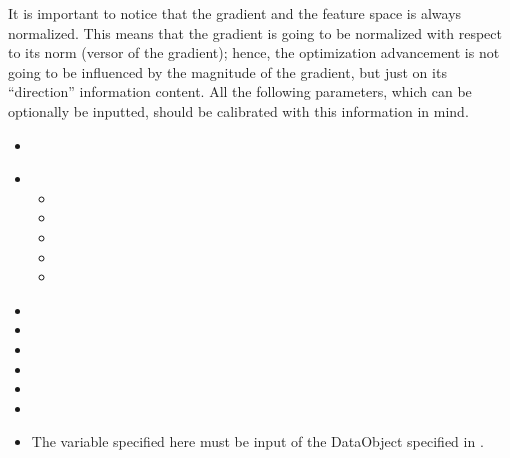 It is important to notice that the gradient and the feature space is always normalized. This means that the gradient is going to be
normalized with respect to its norm (versor of the gradient); hence, the optimization advancement is not going to be influenced by the
magnitude of the gradient, but just on its ``direction'' information content. All the following parameters, which can be optionally be inputted, should be calibrated with this information in mind.
%

%
\attrsIntro
\vspace{-5mm}
\begin{itemize}
\itemsep0em
\item \nameDescription
\end{itemize}
\vspace{-5mm}
\begin{itemize}
\item \initialization
  \begin{itemize}
    \item \limit
    \item \initialSeed
    \item \type
    \item \thresholdTrajRemoval
    \item \writeSteps
  \end{itemize}
\end{itemize}
\begin{itemize}
\item {}
\item \objectVar
\item \samplerInOpt
\item \functionInOpt
\item \Preconditioner
\item \multilevel
\end{itemize}
\begin{itemize}
\item \variableDescription
 The variable specified here must be input of the DataObject specified in .
 \variableChildrenIntro
 \begin{itemize}
  \end{itemize}
\end{itemize}
\constantVariablesDescription
